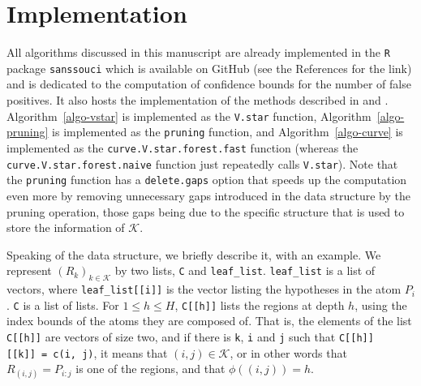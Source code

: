 \documentclass[
  11pt,
  a4paper,
]{article}
\theoremstyle{plain}
\theoremstyle{plain}
\theoremstyle{definition}
\theoremstyle{plain}
\theoremstyle{definition}
\theoremstyle{remark}
\begin{document}
\section{Implementation}\label{sec-implementation}

All algorithms discussed in this manuscript are already implemented in
the \texttt{R} \citep{R-base} package \texttt{sanssouci}
\citep{sanssouci} which is available on GitHub (see the References for
the link) and is dedicated to the computation of confidence bounds for
the number of false positives. It also hosts the implementation of the
methods described in \citet{MR4124323} and
\citet{10.1093/bioinformatics/btac693}. Algorithm~\ref{algo-vstar} is
implemented as the \texttt{V.star} function,
Algorithm~\ref{algo-pruning} is implemented as the \texttt{pruning}
function, and Algorithm~\ref{algo-curve} is implemented as the
\texttt{curve.V.star.forest.fast} function (whereas the
\texttt{curve.V.star.forest.naive} function just repeatedly calls
\texttt{V.star}). Note that the \texttt{pruning} function has a
\texttt{delete.gaps} option that speeds up the computation even more by
removing unnecessary gaps introduced in the data structure by the
pruning operation, those gaps being due to the specific structure that
is used to store the information of \(\mathcal{K}\).

Speaking of the data structure, we briefly describe it, with an example.
We represent \((R_k)_{k\in\mathcal{K}}\) by two lists, \texttt{C} and
\texttt{leaf\_list}. \texttt{leaf\_list} is a list of vectors, where
\texttt{leaf\_list{[}{[}i{]}{]}} is the vector listing the hypotheses in
the atom \(P_i\). \texttt{C} is a list of lists. For \(1\leq h\leq H\),
\texttt{C{[}{[}h{]}{]}} lists the regions at depth \(h\), using the
index bounds of the atoms they are composed of. That is, the elements of
the list \texttt{C{[}{[}h{]}{]}} are vectors of size two, and if there
is \texttt{k}, \texttt{i} and \texttt{j} such that
\texttt{C{[}{[}h{]}{]}{[}{[}k{]}{]}\ =\ c(i,\ j)}, it means that
\((i, j)\in\mathcal{K}\), or in other words that \(R_{(i,j)}=P_{i:j}\)
is one of the regions, and that \(\phi((i, j))=h\).
\end{document}

